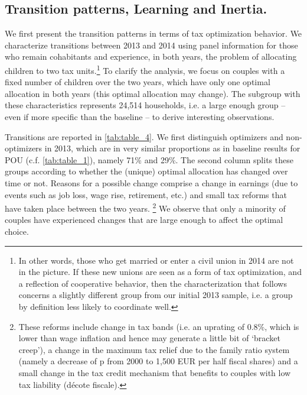 \subsection{Transition patterns, Learning and Inertia. }
We first present the transition patterns in terms of tax optimization behavior. We characterize transitions between 2013 and 2014 using panel information for those who remain cohabitants and experience, in both years, the problem of allocating children to two tax units.\footnote{In other words, those who get married or enter a civil union in 2014 are not in the picture. If these new unions are seen as a form of tax optimization, and a reflection of cooperative behavior, then the characterization that follows concerns a slightly different group from our initial 2013 sample, i.e. a group by definition less likely to coordinate well.
}
To clarify the analysis, we focus on couples with a fixed number of children over the two years, which have only one optimal allocation in both years (this optimal allocation may change). The subgroup with these characteristics represents 24,514 households, i.e. a large enough group – even if more specific than the baseline – to derive interesting observations. 


\medskip
Transitions are reported in \autoref{tab:table_4}. We first distinguish optimizers and non-optimizers in 2013, which are in very similar proportions as in baseline results for POU (c.f. \autoref{tab:table_1}), namely 71\% and 29\%. The second column splits these groups according to whether the (unique) optimal allocation has changed over time or not. Reasons for a possible change comprise a change in earnings (due to events such as job loss, wage rise, retirement, etc.) and small tax reforms that have taken place between the two years. \footnote{
    These reforms include change in tax bands (i.e. an uprating of 0.8\%, which is lower than wage inflation and hence may generate a little bit of `bracket creep’), a change in the maximum tax relief due to the family ratio system (namely a decrease of p from 2000 to 1,500 EUR per half fiscal shares) and a small change in the tax credit mechanism that benefits to couples with low tax liability (décote fiscale).}
 We observe that only a minority of couples have experienced changes that are large enough to affect the optimal choice. 



